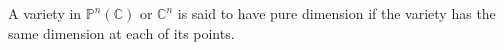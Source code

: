 A variety in $\mathbb{P}^n(\mathbb{C})$ or $\mathbb{C}^n$ is said to have pure dimension if the variety has the same dimension at each of its points.

